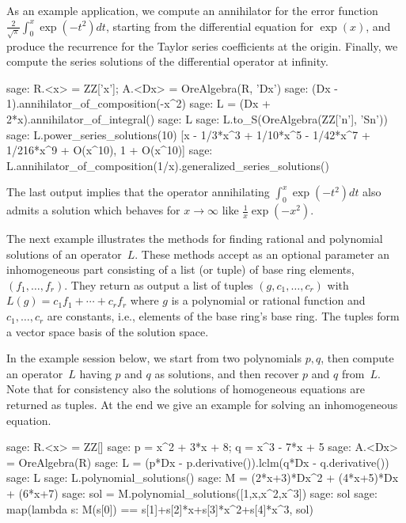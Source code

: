 \documentclass{llncs}
\begin{document}
\smallskip

As an example application, we compute an annihilator for the error function
$\frac{2}{\sqrt{\pi}} \int_0^x \exp(-t^2) dt$, starting from the differential
equation for $\exp(x)$, and produce the recurrence for the Taylor series
coefficients at the origin. Finally, we compute the series solutions of the
differential operator at infinity. 

\begin{sageexample}
  sage: R.<x> = ZZ['x']; A.<Dx> = OreAlgebra(R, 'Dx')                            
  sage: (Dx - 1).annihilator_of_composition(-x^2)
  sage: L = (Dx + 2*x).annihilator_of_integral()                                     
  sage: L
  sage: L.to_S(OreAlgebra(ZZ['n'], 'Sn'))                          
  sage: L.power_series_solutions(10)                               
  [x - 1/3*x^3 + 1/10*x^5 - 1/42*x^7 + 1/216*x^9 + O(x^10), 1 + O(x^10)]
  sage: L.annihilator_of_composition(1/x).generalized_series_solutions()
\end{sageexample}

The last output implies that the operator annihilating $\int_0^x \exp(-t^2) dt$
also admits a solution which behaves for $x\to\infty$ like $\frac1x\exp(-x^2)$.

The next example illustrates the methods for finding rational and polynomial
solutions of an operator~$L$.  These methods accept as an optional parameter an
inhomogeneous part consisting of a list (or tuple) of base ring elements,
$(f_1,\dots,f_r)$. They return as output a list of tuples $(g,c_1,\dots,c_r)$
with $L(g)=c_1f_1+\cdots+c_rf_r$ where $g$ is a polynomial or rational function
and $c_1,\dots,c_r$ are constants, i.e., elements of the base ring's base
ring. The tuples form a vector space basis of the solution space.

In the example session below, we start from two polynomials $p,q$, then compute an 
operator~$L$ having $p$ and $q$ as solutions, and then recover $p$ and $q$ from~$L$.
Note that for consistency also the solutions of homogeneous equations are returned as 
tuples. At the end we give an example for solving an inhomogeneous equation.

\begin{sageexample}
  sage: R.<x> = ZZ[]
  sage: p = x^2 + 3*x + 8; q = x^3 - 7*x + 5
  sage: A.<Dx> = OreAlgebra(R)
  sage: L = (p*Dx - p.derivative()).lclm(q*Dx - q.derivative())
  sage: L
  sage: L.polynomial_solutions()
  sage: M = (2*x+3)*Dx^2 + (4*x+5)*Dx + (6*x+7)
  sage: sol = M.polynomial_solutions([1,x,x^2,x^3])
  sage: sol
  sage: map(lambda s: M(s[0]) == s[1]+s[2]*x+s[3]*x^2+s[4]*x^3, sol)
\end{sageexample}
\end{document}
